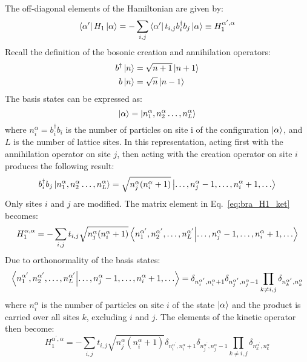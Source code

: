 \documentclass[12pt, two sided]{article}
\begin{document}
The off-diagonal elements of the Hamiltonian are given by:
%
\begin{equation}
\label{eq:bra_H1_ket}
\bra{\alpha^\prime} H_1 \ket{\alpha} = - \sum_{i,j} \bra{\alpha^\prime} t_{i,j} b_i^{\dag} b_j \ket{\alpha}  \equiv H_1^{\alpha^\prime,\alpha}
\end{equation}
%
Recall the definition of the bosonic creation and annihilation operators:
%
\begin{align}
b^\dag \ket{n} &= \sqrt{n+1} \ket{n+1} \\
b \ket{n} &= \sqrt{n} \ket{n-1} 
\end{align}
%
The basis states can be expressed as:
%
\begin{equation}
\ket{\alpha} = \ket{n_1^{\alpha},n_2^{\alpha} \dots , n_L^{\alpha}}
\end{equation}
%
where $n_i^{\alpha} = b_i^\dag b_i$ is the number of particles on site i of the configuration $\ket{\alpha}$, and $L$ is the number of lattice sites. In this representation, acting first with the annihilation operator on site $j$, then acting with the creation operator on site $i$ produces the following result:
%
\begin{equation}
b_i^\dag b_j \ket{n_1^{\alpha},n_2^{\alpha} \dots , n_L^{\alpha   }} = \sqrt{n_j^{\alpha}(n_i^{\alpha}+1)} \ket{\dots , n_j^{\alpha}-1, \dots, n_i^{\alpha}+1, \dots} 
\end{equation}
%
Only sites $i$ and $j$ are modified. The matrix element in Eq.~\eqref{eq:bra_H1_ket} becomes:
%
\begin{equation}
H_1^{\alpha,\alpha} = -\sum_{i,j} t_{i,j} \sqrt{n_j^{\alpha}(n_i^{\alpha}+1)} \bra{n^{\alpha^\prime}_1,n^{\alpha^\prime}_2,\dots,n^{\alpha^\prime}_L} \ket{\dots , n_j^{\alpha}-1, \dots, n_i^{\alpha}+1, \dots} 
\end{equation}
%
Due to orthonormality of the basis states:
%
\begin{equation}
\bra{n^{\alpha^\prime}_1,n^{\alpha^\prime}_2,\dots,n^{\alpha^\prime}_L} \ket{\dots , n_j^{\alpha}-1, \dots, n_i^{\alpha}+1, \dots}  = \delta_{n_i^{\alpha^\prime}, n_i^{\alpha}+1} \delta_{n_j^{\alpha^\prime},n_j^{\alpha}-1} \prod_{k \neq i,j} \delta_{n_k^{\alpha^\prime},n_k^{\alpha}}
\end{equation}
%
where $n^{\alpha}_i$ is the number of particles on site $i$ of the state $\ket{\alpha}$ and the product is carried over all sites $k$, excluding $i$ and $j$. The elements of the kinetic operator then become:
%
\begin{equation}
\label{eq:off_diagonal_elements}
H_1^{\alpha^\prime,\alpha} = -\sum_{i,j} t_{i,j}  \sqrt{n_j^{\alpha}(n_i^{\alpha}+1)} \delta_{n_i^{\alpha^\prime}, n_i^{\alpha}+1} \delta_{n_j^{\alpha^\prime},n_j^{\alpha}-1} \prod_{k \neq i,j} \delta_{n_k^{\alpha^\prime},n_k^{\alpha}}
\end{equation}
%
\end{document}
